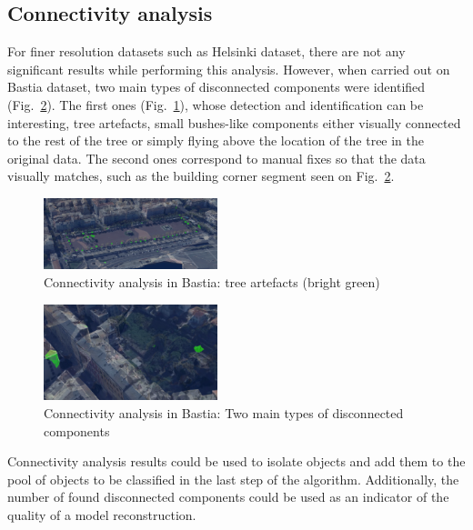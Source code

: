 \documentclass{kththesis}
\begin{document}
\subsection{Connectivity analysis}
For finer resolution datasets such as Helsinki dataset, there are not any significant results while performing this analysis. However, when carried out on Bastia dataset, two main types of disconnected components were identified (Fig.~\ref{fig:bastia_connec_analysis_types_of_comp}). The first ones (Fig.~\ref{fig:bastia_connec_analysis_tree artefacts}), whose detection and identification can be interesting, tree artefacts, small bushes-like components either visually connected to the rest of the tree or simply flying above the location of the tree in the original data. The second ones correspond to manual fixes so that the data visually matches, such as the building corner segment seen on Fig.~\ref{fig:bastia_connec_analysis_types_of_comp}. \\
\begin{figure}[H]
    \centering
    \includegraphics[width=0.45\textwidth]{images/Connectivity_Analysis/flying_bushes.png}
    \caption{Connectivity analysis in Bastia: tree artefacts (bright green) }
    \label{fig:bastia_connec_analysis_tree artefacts}
\end{figure}

\begin{figure}[H]
    \centering
    \includegraphics[width=0.45\textwidth]{images/Connectivity_Analysis/type_of_disc_objects.png}
    \caption{Connectivity analysis in Bastia: Two main types of disconnected components }
    \label{fig:bastia_connec_analysis_types_of_comp}
\end{figure}
Connectivity analysis results could be used to isolate objects and add them to the pool of objects to be classified in the last step of the algorithm. Additionally, the number of found disconnected components could be used as an indicator of the quality of a model reconstruction. 
\end{document}
